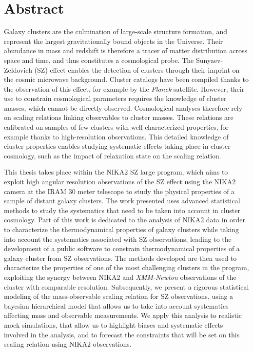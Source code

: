 \documentclass[a4paper, 11pt]{article}
\begin{document}
\section*{Abstract}

Galaxy clusters are the culmination of large-scale structure formation, and represent the largest gravitationally bound objects in the Universe. Their abundance in mass and redshift is therefore a tracer of matter distribution across space and time, and thus constitutes a cosmological probe. The Sunyaev-Zeldovich (SZ) effect enables the detection of clusters through their imprint on the cosmic microwave background. Cluster catalogs have been compiled thanks to the observation of this effect, for example by the \textit{Planck} satellite. However, their use to constrain cosmological parameters requires the knowledge of cluster masses, which cannot be directly observed. Cosmological analyses therefore rely on scaling relations linking observables to cluster masses. These relations are calibrated on samples of few clusters with well-characterized properties, for example thanks to high-resolution observations. This detailed knowledge of cluster properties enables studying systematic effects taking place in cluster cosmology, such as the impact of relaxation state on the scaling relation.

This thesis takes place within the NIKA2 SZ large program, which aims to exploit high angular resolution observations of the SZ effect using the NIKA2 camera at the IRAM 30 meter telescope to study the physical properties of a sample of distant galaxy clusters. The work presented uses advanced statistical methods to study the systematics that need to be taken into account in cluster cosmology. Part of this work is dedicated to the analysis of NIKA2 data in order to characterize the thermodynamical properties of galaxy clusters while taking into account the systematics associated with SZ observations, leading to the development of a public software to constrain thermodynamical properties of a galaxy cluster from SZ observations. The methods developed are then used to characterize the properties of one of the most challenging clusters in the program, exploiting the synergy between NIKA2 and \textit{XMM-Newton} observations of the cluster with comparable resolution. Subsequently, we present a rigorous statistical modeling of the mass-observable scaling relation for SZ observations, using a bayesian hierarchical model that allows us to take into account systematics affecting mass and observable measurements. We apply this analysis to realistic mock simulations, that allow us to highlight biases and systematic effects involved in the analysis, and to forecast the constraints that will be set on this scaling relation using NIKA2 observations.
\end{document}
